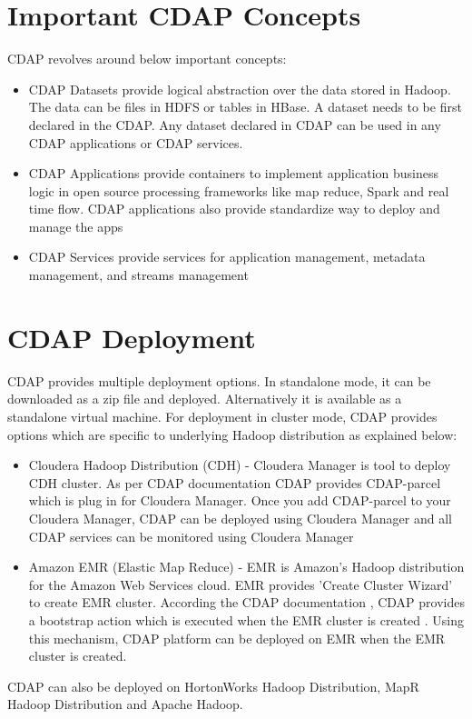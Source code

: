 \documentclass[9pt,twocolumn,twoside]{styles/osajnl}
\begin{document}
\section{Important CDAP Concepts}
CDAP revolves around below important concepts:
\begin{itemize}
\item CDAP Datasets provide logical abstraction over the data stored in
Hadoop. The data can be files in HDFS or tables in HBase. A dataset needs to
be first declared in the CDAP. Any dataset declared in CDAP can be used in
any CDAP applications or CDAP services.
\item CDAP Applications provide containers to implement application business
logic in open source processing frameworks like map reduce, Spark and real
time flow. CDAP applications also provide standardize way to deploy and
manage the apps
\item CDAP Services provide services for application management, metadata
management, and streams management
\end{itemize}

\section{CDAP Deployment}
CDAP provides multiple deployment options. In standalone mode, it can be
downloaded as a zip file and deployed.
Alternatively it is available as a standalone virtual machine.
For deployment in cluster mode, CDAP provides options which are specific to
underlying Hadoop distribution as explained below:
\begin{itemize}
\item Cloudera Hadoop Distribution (CDH) - Cloudera Manager is tool to
 deploy CDH cluster. As per CDAP documentation
\cite{www-cdap-cloudera-manager} CDAP provides CDAP-parcel which is plug in for
Cloudera Manager. Once you add CDAP-parcel
to your Cloudera Manager, CDAP can be deployed using Cloudera Manager and all
 CDAP services can be monitored using Cloudera Manager
\item Amazon EMR (Elastic Map Reduce) - EMR is Amazon's Hadoop distribution
for the Amazon Web Services cloud. EMR provides 'Create Cluster Wizard' to
create EMR cluster. According the CDAP documentation \cite{www-cdap-emr}, CDAP
provides a bootstrap action which is executed when the EMR cluster is created
. Using this mechanism, CDAP platform can be deployed on EMR when the EMR
cluster is created.
\end{itemize}
CDAP can also be deployed on HortonWorks Hadoop Distribution, MapR Hadoop
Distribution and Apache Hadoop.
\end{document}
